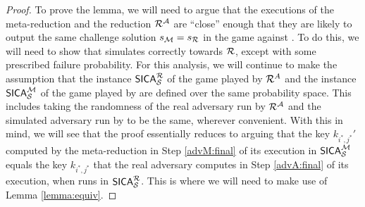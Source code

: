 \begin{proof}
  To prove the lemma,
  we will need to argue that the executions of the meta-reduction \redM
  and the reduction \(\redR^{\advA}\) are ``close'' enough
  that they are likely to output the same challenge solution \(s_{\redM} = s_{\redR}\)
  in the \SICA game against \Simple.
  To do this, we will need to show that \redM simulates \advA
  correctly towards \(\redR\), except with some prescribed failure probability.
  For this analysis, we will continue to make the assumption that
  the instance \(\SICA_{\Simple}^{\redR}\) of the \SICA game played by \(\redR^{A}\)
  and the instance \(\mathsf{SICA}_{\mathcal{S}}^{\mathcal{M}}\) of the \SICA game played by \redM
  are defined over the same probability space.
  This includes taking the randomness of the real adversary
  \advA run by \(\redR^{\advA}\)
  and the simulated adversary run by \redM to be the same,
  wherever convenient.
  With this in mind, we will see that
  the proof essentially reduces to arguing that
  the key \(k_{i^{*},j^{*}}'\) computed by the meta-reduction
  \redM in Step \ref{advM:final} of its execution in \(\mathsf{SICA}_{\mathcal{S}}^{\mathcal{M}}\)
  equals the key \(k_{i^{*},j^{*}}\)
  that the real adversary \advA computes in Step \ref{advA:final} of its execution,
  when \redR runs \advA in \(\SICA_{\Simple}^{\redR}\).
  This is where we will need to make use of Lemma \ref{lemma:equiv}.


\end{proof}

